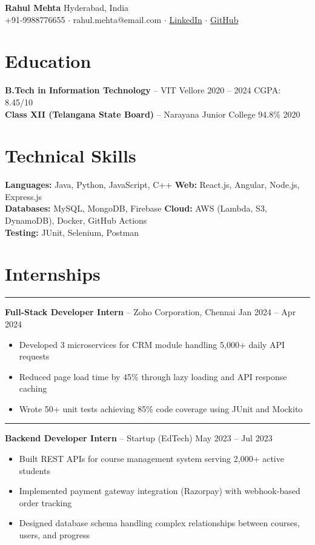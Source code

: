 \documentclass[10pt,a4paper]{article}
\newcommand{\accentbar}{\color{accent}\rule[-1pt]{2pt}{10pt}\hspace{4pt}}
\begin{document}
{\large\bfseries Rahul Mehta} \hfill {\footnotesize\color{accent} Hyderabad, India}\\
{\footnotesize +91-9988776655 $\cdot$ rahul.mehta@email.com $\cdot$ \href{https://linkedin.com/in/rahulmehta-dev}{LinkedIn} $\cdot$ \href{https://github.com/rahulmehta}{GitHub}}

\vspace{6pt}

\section{Education}

\textbf{B.Tech in Information Technology} -- VIT Vellore \hfill 2020 -- 2024 \quad CGPA: 8.45/10\\
\textbf{Class XII (Telangana State Board)} -- Narayana Junior College \hfill 94.8\% \hfill 2020

\section{Technical Skills}

{\footnotesize
\textbf{Languages:} Java, Python, JavaScript, C++ \quad \textbf{Web:} React.js, Angular, Node.js, Express.js\\
\textbf{Databases:} MySQL, MongoDB, Firebase \quad \textbf{Cloud:} AWS (Lambda, S3, DynamoDB), Docker, GitHub Actions\\
\textbf{Testing:} JUnit, Selenium, Postman
}

\section{Internships}

\accentbar\textbf{Full-Stack Developer Intern} -- Zoho Corporation, Chennai \hfill {\footnotesize Jan 2024 -- Apr 2024}
\begin{itemize}
    \item Developed 3 microservices for CRM module handling 5,000+ daily API requests
    \item Reduced page load time by 45\% through lazy loading and API response caching
    \item Wrote 50+ unit tests achieving 85\% code coverage using JUnit and Mockito
\end{itemize}

\accentbar\textbf{Backend Developer Intern} -- Startup (EdTech) \hfill {\footnotesize May 2023 -- Jul 2023}
\begin{itemize}
    \item Built REST APIs for course management system serving 2,000+ active students
    \item Implemented payment gateway integration (Razorpay) with webhook-based order tracking
    \item Designed database schema handling complex relationships between courses, users, and progress
\end{itemize}
\end{document}
